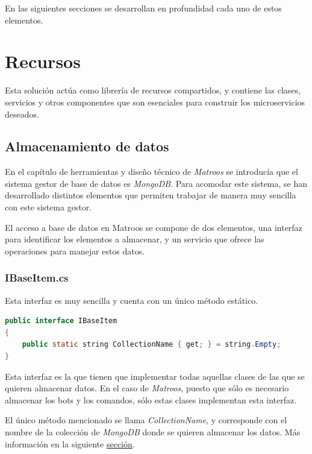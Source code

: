 En las siguientes secciones se desarrollan en profundidad cada uno de estos elementos.









\section{Recursos}

Esta solución actúa como librería de recursos compartidos, y contiene las clases, servicios y otros componentes que son esenciales para construir los microservicios deseados.

\subsection{Almacenamiento de datos}

En el capítulo de herramientas y diseño técnico de \textit{Matroos} se introducía que el sistema gestor de base de datos es \textit{MongoDB}. Para acomodar este sistema, se han desarrollado distintos elementos que permiten trabajar de manera muy sencilla con este sistema gestor.

El acceso a base de datos en Matroos se compone de dos elementos, una interfaz para identificar los elementos a almacenar, y un servicio que ofrece las operaciones para manejar estos datos.

\subsubsection{IBaseItem.cs}

Esta interfaz es muy sencilla y cuenta con un único método estático.

\begin{lstlisting}[language=java]
public interface IBaseItem
{
    public static string CollectionName { get; } = string.Empty;
}
\end{lstlisting}

Esta interfaz es la que tienen que implementar todas aquellas clases de las que se quieren almacenar datos. En el caso de \textit{Matroos}, puesto que sólo es necesario almacenar los bots y los comandos, sólo estas clases implementan esta interfaz.

El único método mencionado se llama \textit{CollectionName}, y corresponde con el nombre de la colección de \textit{MongoDB} donde se quieren almacenar los datos. Más información en la siguiente \hyperref[sec:datacontextservice]{sección}.

